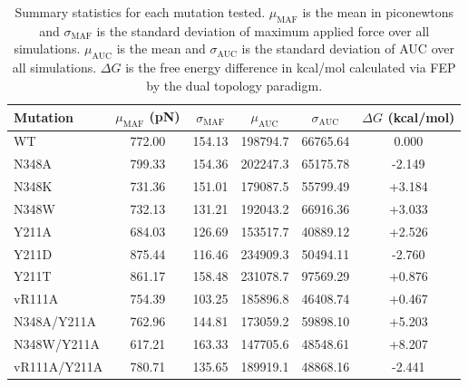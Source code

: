 \documentclass[12pt]{article}
\begin{document}
\clearpage
\begin {table}[H]
\caption{\label{tab:summary_statistics}Summary statistics for each mutation tested. $\mu_\text{MAF}$ is the mean in piconewtons and $\sigma_\text{MAF}$ is the standard deviation of maximum applied force over all simulations. $\mu_\text{AUC}$ is the mean and $\sigma_\text{AUC}$ is the standard deviation of AUC over all simulations. $\Delta G$ is the free energy difference in kcal/mol calculated via FEP by the dual topology paradigm.}
\begin{center}
  \resizebox{15cm}{!} {
    \begin{tabular}{l c c c c c}
    \hline
      Mutation & $\mu_\text{MAF}$ (pN) & $\sigma_\text{MAF}$ & $\mu_\text{AUC}$ & $\sigma_\text{AUC}$ & $\Delta G$ (kcal/mol)\\ \hline
            WT &                772.00 &              154.13 &         198794.7 &            66765.64 &  0.000\\
         N348A &                799.33 &              154.36 &         202247.3 &            65175.78 & -2.149\\
         N348K &                731.36 &              151.01 &         179087.5 &            55799.49 & +3.184\\
         N348W &                732.13 &              131.21 &         192043.2 &            66916.36 & +3.033\\
         Y211A &                684.03 &              126.69 &         153517.7 &            40889.12 & +2.526\\ 
         Y211D &                875.44 &              116.46 &         234909.3 &            50494.11 & -2.760\\ 
         Y211T &                861.17 &              158.48 &         231078.7 &            97569.29 & +0.876\\
        vR111A &                754.39 &              103.25 &         185896.8 &            46408.74 & +0.467\\
   N348A/Y211A &                762.96 &              144.81 &         173059.2 &            59898.10 & +5.203\\
   N348W/Y211A &                617.21 &              163.33 &         147705.6 &            48548.61 & +8.207\\
  vR111A/Y211A &                780.71 &              135.65 &         189919.1 &            48868.16 & -2.441\\
    \hline
    \end{tabular}
  }
\end{center}
\end{table}
\end{document}
